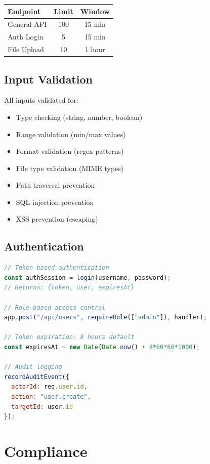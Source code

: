 \documentclass[12pt,a4paper]{report}
\begin{document}
\begin{tabular}{|l|c|c|}
\hline
\textbf{Endpoint} & \textbf{Limit} & \textbf{Window} \\
\hline
General API & 100 & 15 min \\
Auth Login & 5 & 15 min \\
File Upload & 10 & 1 hour \\
\hline
\end{tabular}

\subsection{Input Validation}

All inputs validated for:
\begin{itemize}
    \item Type checking (string, number, boolean)
    \item Range validation (min/max values)
    \item Format validation (regex patterns)
    \item File type validation (MIME types)
    \item Path traversal prevention
    \item SQL injection prevention
    \item XSS prevention (escaping)
\end{itemize}

\subsection{Authentication}

\begin{lstlisting}[language=JavaScript]
// Token-based authentication
const authSession = login(username, password);
// Returns: {token, user, expiresAt}

// Role-based access control
app.post("/api/users", requireRole(["admin"]), handler);

// Token expiration: 8 hours default
const expiresAt = new Date(Date.now() + 8*60*60*1000);

// Audit logging
recordAuditEvent({
  actorId: req.user.id,
  action: "user.create",
  targetId: user.id
});
\end{lstlisting}

\section{Compliance}
\end{document}
